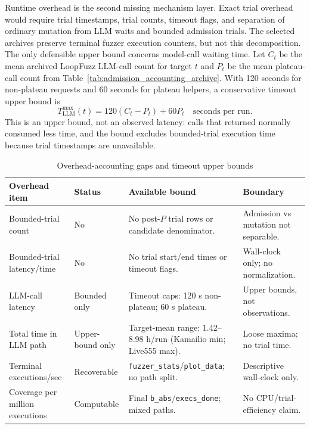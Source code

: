 \documentclass[final,5p,times,number]{elsarticle}
\begin{document}
Runtime overhead is the second missing mechanism layer. Exact trial overhead would require trial timestamps, trial counts, timeout flags, and separation of ordinary mutation from LLM waits and bounded admission trials. The selected archives preserve terminal fuzzer execution counters, but not this decomposition. The only defensible upper bound concerns model-call waiting time. Let $C_t$ be the mean archived LoopFuzz LLM-call count for target $t$ and $P_t$ be the mean plateau-call count from Table~\ref{tab:admission_accounting_archive}. With 120 seconds for non-plateau requests and 60 seconds for plateau helpers, a conservative timeout upper bound is
\[
T^{\max}_{\mathrm{LLM}}(t) = 120(C_t-P_t)+60P_t \quad \text{seconds per run}.
\]
This is an upper bound, not an observed latency: calls that returned normally consumed less time, and the bound excludes bounded-trial execution time because trial timestamps are unavailable.

\begin{table}[!t]
\centering
\caption{Overhead-accounting gaps and timeout upper bounds}
\label{tab:overhead_accounting_gap}
{\scriptsize
\setlength{\tabcolsep}{3.2pt}
\renewcommand{\arraystretch}{1.05}
\begin{tabularx}{\textwidth}{>{\raggedright\arraybackslash}p{}
                              >{\raggedright\arraybackslash}p{}
                              >{\raggedright\arraybackslash}p{}
                              X}
\toprule
\textbf{Overhead item} & \textbf{Status} & \textbf{Available bound} & \textbf{Boundary} \\
\midrule
Bounded-trial count &
No &
No post-$P$ trial rows or candidate denominator. &
Admission vs mutation not separable. \\
\midrule
Bounded-trial latency/time &
No &
No trial start/end times or timeout flags. &
Wall-clock only; no normalization. \\
\midrule
LLM-call latency &
Bounded only &
Timeout caps: 120 s non-plateau; 60 s plateau. &
Upper bounds, not observations. \\
\midrule
Total time in LLM path &
Upper-bound only &
Target-mean range: 1.42--8.98 h/run (Kamailio min; Live555 max). &
Loose maxima; no trial time. \\
\midrule
Terminal executions/sec &
Recoverable &
\texttt{fuzzer\_stats}/\texttt{plot\_data}; no path split. &
Descriptive wall-clock only. \\
\midrule
Coverage per million executions &
Computable &
Final \texttt{b\_abs}/\texttt{execs\_done}; mixed paths. &
No CPU/trial-efficiency claim. \\
\bottomrule
\end{tabularx}
}
\end{table}
\end{document}
